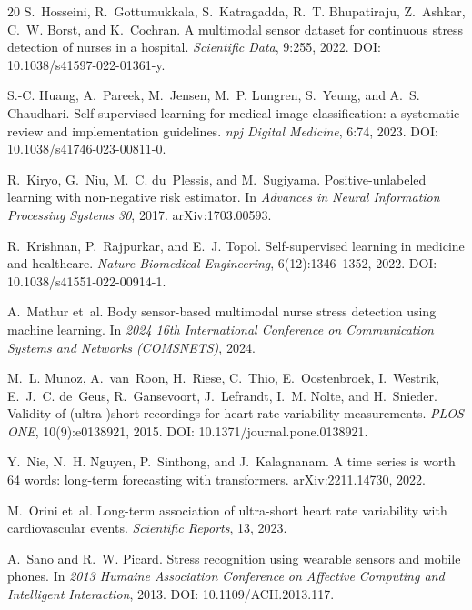 \documentclass{article}
\begin{document}
\begin{thebibliography}{20}
S.~Hosseini, R.~Gottumukkala, S.~Katragadda, R.~T. Bhupatiraju, Z.~Ashkar,
  C.~W. Borst, and K.~Cochran.
\newblock A multimodal sensor dataset for continuous stress detection of nurses
  in a hospital.
\newblock \emph{Scientific Data}, 9:255, 2022.
\newblock DOI: 10.1038/s41597-022-01361-y.

S.-C. Huang, A.~Pareek, M.~Jensen, M.~P. Lungren, S.~Yeung, and
  A.~S. Chaudhari.
\newblock Self-supervised learning for medical image classification: a
  systematic review and implementation guidelines.
\newblock \emph{npj Digital Medicine}, 6:74, 2023.
\newblock DOI: 10.1038/s41746-023-00811-0.

R.~Kiryo, G.~Niu, M.~C. du~Plessis, and M.~Sugiyama.
\newblock Positive-unlabeled learning with non-negative risk estimator.
\newblock In \emph{Advances in Neural Information Processing Systems 30}, 2017.
\newblock arXiv:1703.00593.

R.~Krishnan, P.~Rajpurkar, and E.~J. Topol.
\newblock Self-supervised learning in medicine and healthcare.
\newblock \emph{Nature Biomedical Engineering}, 6(12):1346--1352, 2022.
\newblock DOI: 10.1038/s41551-022-00914-1.

A.~Mathur et~al.
\newblock Body sensor-based multimodal nurse stress detection using machine
  learning.
\newblock In \emph{2024 16th International Conference on Communication Systems
  and Networks (COMSNETS)}, 2024.

M.~L. Munoz, A.~van~Roon, H.~Riese, C.~Thio, E.~Oostenbroek, I.~Westrik,
  E.~J.~C. de~Geus, R.~Gansevoort, J.~Lefrandt, I.~M. Nolte, and H.~Snieder.
\newblock Validity of (ultra-)short recordings for heart rate variability
  measurements.
\newblock \emph{PLOS ONE}, 10(9):e0138921, 2015.
\newblock DOI: 10.1371/journal.pone.0138921.

Y.~Nie, N.~H. Nguyen, P.~Sinthong, and J.~Kalagnanam.
\newblock A time series is worth 64 words: long-term forecasting with
  transformers.
\newblock arXiv:2211.14730, 2022.

M.~Orini et~al.
\newblock Long-term association of ultra-short heart rate variability with
  cardiovascular events.
\newblock \emph{Scientific Reports}, 13, 2023.

A.~Sano and R.~W. Picard.
\newblock Stress recognition using wearable sensors and mobile phones.
\newblock In \emph{2013 Humaine Association Conference on Affective Computing
  and Intelligent Interaction}, 2013.
\newblock DOI: 10.1109/ACII.2013.117.


\end{thebibliography}
\end{document}
